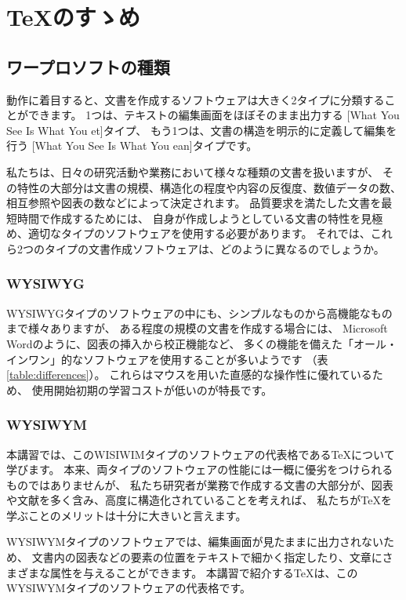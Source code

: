 \documentclass[TeXworkshop]{subfiles}
\begin{document}
\clearpage

\section{\TeX のすゝめ}

\subsection{ワープロソフトの種類}
動作に着目すると、文書を作成するソフトウェアは大きく2タイプに分類することができます。
1つは、テキストの編集画面をほぼそのまま出力する
[What You See Is What You et]タイプ、
もう1つは、文書の構造を明示的に定義して編集を行う
 [What You See Is What You ean]タイプです。

私たちは、日々の研究活動や業務において様々な種類の文書を扱いますが、
その特性の大部分は文書の規模、構造化の程度や内容の反復度、数値データの数、相互参照や図表の数などによって決定されます。
品質要求を満たした文書を最短時間で作成するためには、
自身が作成しようとしている文書の特性を見極め、適切なタイプのソフトウェアを使用する必要があります。
それでは、これら2つのタイプの文書作成ソフトウェアは、どのように異なるのでしょうか。

\subsubsection{WYSIWYG}
WYSIWYGタイプのソフトウェアの中にも、シンプルなものから高機能なものまで様々ありますが、
ある程度の規模の文書を作成する場合には、
Microsoft Wordのように、図表の挿入から校正機能など、
多くの機能を備えた「オール・インワン」的なソフトウェアを使用することが多いようです
（表 \ref{table:differences}）。
これらはマウスを用いた直感的な操作性に優れているため、
使用開始初期の学習コストが低いのが特長です。


\subsubsection{WYSIWYM}
本講習では、このWISIWIMタイプのソフトウェアの代表格である\TeX について学びます。
本来、両タイプのソフトウェアの性能には一概に優劣をつけられるものではありませんが、
私たち研究者が業務で作成する文書の大部分が、図表や文献を多く含み、高度に構造化されていることを考えれば、
私たちが\TeX を学ぶことのメリットは十分に大きいと言えます。

WYSIWYMタイプのソフトウェアでは、編集画面が見たままに出力されないため、
文書内の図表などの要素の位置をテキストで細かく指定したり、文章にさまざまな属性を与えることができます。
本講習で紹介する\TeX は、このWYSIWYMタイプのソフトウェアの代表格です。
\end{document}
